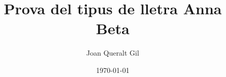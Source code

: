 \documentclass[a4paper,%
	      twoside,%
	      11pt,%
	      BCOR1.0cm,%
	      DIV11,%
	      abstracton,%
	      ]{scrartcl}
\begin{document}
 \title{Prova del tipus de lletra Anna Beta}
 \author{Joan Queralt Gil}
 \date{\today}
 \maketitle
 \lipsum[1-3]
 
\end{document}
